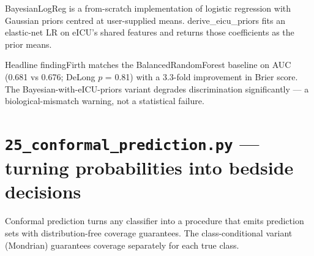 \documentclass[11pt,a4paper]{article}
\begin{document}
BayesianLogReg is a from-scratch implementation of logistic regression with Gaussian priors centred at user-supplied means. derive\_eicu\_priors fits an elastic-net LR on eICU's shared features and returns those coefficients as the prior means.
\begin{callout}{Headline finding}Firth matches the BalancedRandomForest baseline on AUC (0.681 vs 0.676; DeLong $p$ = 0.81) with a 3.3-fold improvement in Brier score. The Bayesian-with-eICU-priors variant degrades discrimination significantly — a biological-mismatch warning, not a statistical failure.\end{callout}
\clearpage
\section{\texttt{25\_conformal\_prediction.py} — turning probabilities into bedside decisions}
Conformal prediction turns any classifier into a procedure that emits prediction sets with distribution-free coverage guarantees. The class-conditional variant (Mondrian) guarantees coverage separately for each true class.
\end{document}
